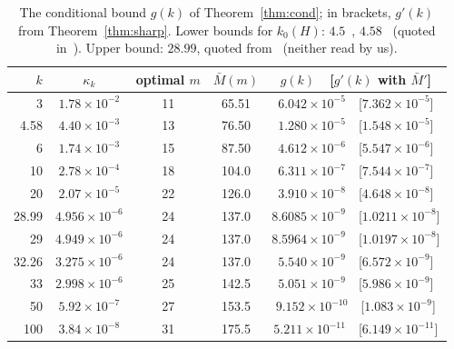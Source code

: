 \documentclass[11pt]{article}
\theoremstyle{definition}
\theoremstyle{remark}
\begin{document}
\begin{table}[t]
\centering
\begin{tabular}{rcccc}
\toprule
$k$ & $\kappa_k$ & optimal $m$ & $\bar M(m)$ & $g(k)$\ \ [$g'(k)$ with $\bar M'$]\\
\midrule
3     & $1.78\times10^{-2}$ & 11 & 65.51  & $6.042\times10^{-5}$\ \ [$7.362\times10^{-5}$]\\
4.58  & $4.40\times10^{-3}$ & 13 & 76.50  & $1.280\times10^{-5}$\ \ [$1.548\times10^{-5}$]\\
6     & $1.74\times10^{-3}$ & 15 & 87.50  & $4.612\times10^{-6}$\ \ [$5.547\times10^{-6}$]\\
10    & $2.78\times10^{-4}$ & 18 & 104.0  & $6.311\times10^{-7}$\ \ [$7.544\times10^{-7}$]\\
20    & $2.07\times10^{-5}$ & 22 & 126.0  & $3.910\times10^{-8}$\ \ [$4.648\times10^{-8}$]\\
28.99 & $4.956\times10^{-6}$ & 24 & 137.0  & $8.6085\times10^{-9}$\ \ [$1.0211\times10^{-8}$]\\
29    & $4.949\times10^{-6}$ & 24 & 137.0  & $8.5964\times10^{-9}$\ \ [$1.0197\times10^{-8}$]\\
32.26 & $3.275\times10^{-6}$ & 24 & 137.0  & $5.540\times10^{-9}$\ \ [$6.572\times10^{-9}$]\\
33    & $2.998\times10^{-6}$ & 25 & 142.5  & $5.051\times10^{-9}$\ \ [$5.986\times10^{-9}$]\\
50    & $5.92\times10^{-7}$ & 27 & 153.5  & $9.152\times10^{-10}$\ \ [$1.083\times10^{-9}$]\\
100   & $3.84\times10^{-8}$ & 31 & 175.5  & $5.211\times10^{-11}$\ \ [$6.149\times10^{-11}$]\\
\bottomrule
\end{tabular}
\caption{The conditional bound $g(k)$ of Theorem~\ref{thm:cond}; in brackets, $g'(k)$ from
Theorem~\ref{thm:sharp}. Lower bounds for $k_0(H)$: $4.5$~\cite{CGT}, $4.58$~\cite{CP} (quoted in~\cite{Mahesh}).
Upper bound: $28.99$, quoted from~\cite{CP,BCF} (neither read by us).}
\label{tab:g}
\end{table}
\end{document}
